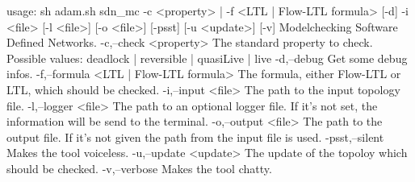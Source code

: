 usage: sh adam.sh sdn_mc -c <property> | -f <LTL | Flow-LTL formula> [-d]  -i <file> [-l
       <file>] [-o <file>] [-psst] [-u <update>] [-v]
Modelchecking Software Defined Networks.
 -c,--check <property>                   The standard property to check. Possible values:
                                         deadlock | reversible | quasiLive | live
 -d,--debug                              Get some debug infos.
 -f,--formula <LTL | Flow-LTL formula>   The formula, either Flow-LTL or LTL, which should be
                                         checked.
 -i,--input <file>                       The path to the input topology file.
 -l,--logger <file>                      The path to an optional logger file. If it's not set,
                                         the information will be send to the terminal.
 -o,--output <file>                      The path to the output file. If it's not given the
                                         path from the input file is used.
 -psst,--silent                          Makes the tool voiceless.
 -u,--update <update>                    The update of the topoloy which should be checked.
 -v,--verbose                            Makes the tool chatty.
